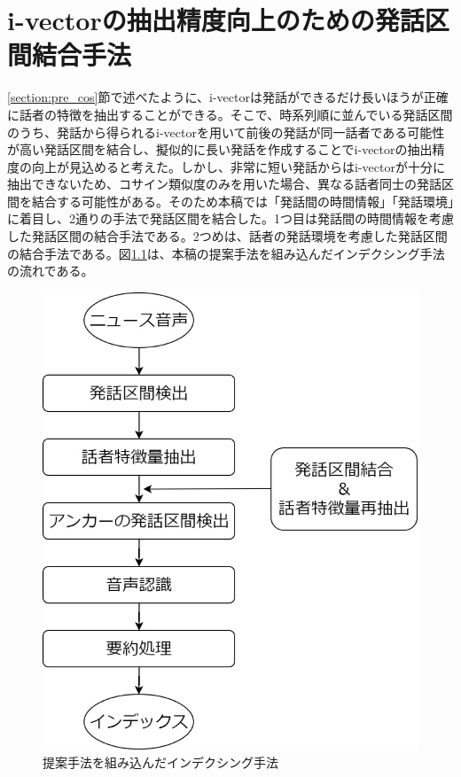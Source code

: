 \chapter{i-vectorの抽出精度向上のための発話区間結合手法}
\label{chapter:prob_method}
\ref{section:pre_cos}節で述べたように、i-vectorは発話ができるだけ長いほうが正確に話者の特徴を抽出することができる。そこで、時系列順に並んでいる発話区間のうち、発話から得られるi-vectorを用いて前後の発話が同一話者である可能性が高い発話区間を結合し、擬似的に長い発話を作成することでi-vectorの抽出精度の向上が見込めると考えた。しかし、非常に短い発話からはi-vectorが十分に抽出できないため、コサイン類似度のみを用いた場合、異なる話者同士の発話区間を結合する可能性がある。そのため本稿では「発話間の時間情報」「発話環境」に着目し、2通りの手法で発話区間を結合した。1つ目は発話間の時間情報を考慮した発話区間の結合手法である。2つめは、話者の発話環境を考慮した発話区間の結合手法である。図\ref{fig:indexing2}は、本稿の提案手法を組み込んだインデクシング手法の流れである。

\begin{figure}[H]
  \begin{center}
    \includegraphics[scale=0.3]{./figure/indexing2.eps}
  \end{center}
  \caption{提案手法を組み込んだインデクシング手法 \label{fig:indexing2}}
\end{figure}

